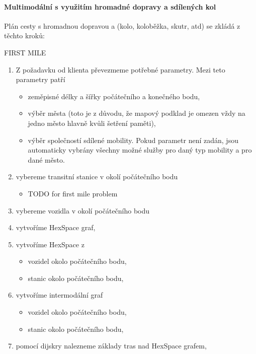 \documentclass[thesis=M,czech]{FITthesis}[2019/12/23]
\theoremstyle{plain}
\theoremstyle{definition}
\begin{document}



\paragraph{Multimodální s využitím hromadné dopravy a sdílených kol}


Plán cesty s hromadnou dopravou a (kolo, koloběžka, skutr, atd) se zkládá z těchto kroků:

FIRST MILE

\begin{enumerate}
	\item Z požadavku od klienta převezmeme potřebné parametry. Mezi teto parametry patří
	\begin{itemize}
		\item zeměpisné délky a šířky počátečního a konečného bodu,
		\item výběr města (toto je z důvodu, že mapový podklad je omezen vždy na jedno město hlavně kvůli šetření paměti),
		\item výběr společností sdílené mobility. Pokud parametr není zadán, jsou automaticky vybrány všechny možné služby pro daný typ mobility a pro dané město.
	\end{itemize}
	\item vybereme transitní stanice v okolí počátečního bodu
	\begin{itemize}
		\item TODO for first mile problem
	\end{itemize}
	\item vybereme vozidla v okolí počátečního bodu
	\item vytvoříme HexSpace graf,
	\item vytvoříme HexSpace z
	\begin{itemize}
		\item vozidel okolo počátečního bodu,
		\item stanic okolo počátečního bodu,
	\end{itemize}
	\item vytvoříme intermodální graf
	\begin{itemize}
		\item vozidel okolo počátečního bodu,
		\item stanic okolo počátečního bodu,
	\end{itemize}
	\item pomocí dijskry nalezneme základy tras nad HexSpace grafem,


\end{enumerate}
\end{document}
